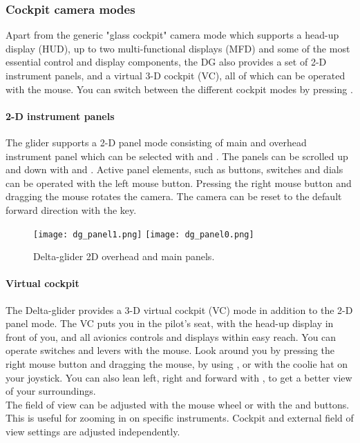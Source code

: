 \documentclass[Orbiter User Manual.tex]{subfiles}
\begin{document}
\subsubsection{Cockpit camera modes}
Apart from the generic "glass cockpit" camera mode which supports a head-up display (HUD), up to two multi-functional displays (MFD) and some of the most essential control and display components, the DG also provides a set of 2-D instrument panels, and a virtual 3-D cockpit (VC), all of which can be operated with the mouse. You can switch between the different cockpit modes by pressing .

\paragraph{2-D instrument panels}
The glider supports a 2-D panel mode consisting of main and overhead instrument panel which can be selected with \Ctrl\UArrow and \Ctrl\DArrow. The panels can be scrolled up and down with \UArrow and \DArrow. Active panel elements, such as buttons, switches and dials can be operated with the left mouse button. Pressing the right mouse button and dragging the mouse rotates the camera. The camera can be reset to the default forward direction with the \Home key.

\begin{figure}[H]
  \centering
  \texttt{[image: dg\_panel1.png]}
  \texttt{[image: dg\_panel0.png]}
  \caption{Delta-glider 2D overhead and main panels.}
\end{figure}

\paragraph{Virtual cockpit}
The Delta-glider provides a 3-D virtual cockpit (VC) mode in addition to the 2-D panel mode. The VC puts you in the pilot's seat, with the head-up display in front of you, and all avionics controls and displays within easy reach. You can operate switches and levers with the mouse. Look around you by pressing the right mouse button and dragging the mouse, by using \Alt\UArrow\DArrow\LArrow\RArrow, or with the coolie hat on your joystick. You can also lean left, right and forward with \Ctrl\Alt\UArrow\DArrow\LArrow\RArrow, to get a better view of your surroundings.\\
The field of view can be adjusted with the mouse wheel or with the  and  buttons. This is useful for zooming in on specific instruments. Cockpit and external field of view settings are adjusted independently.
\end{document}
